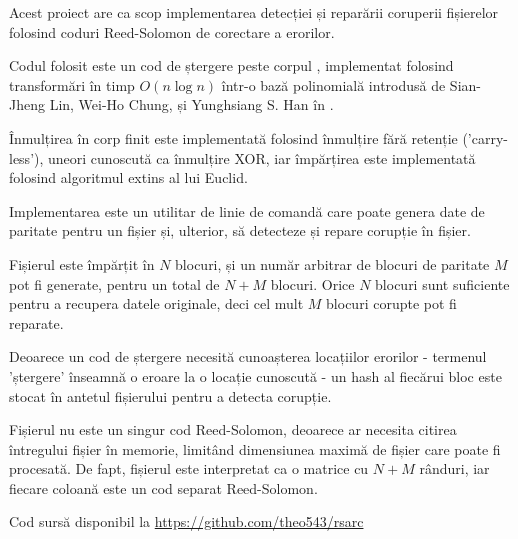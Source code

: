 \begin{abstractpage}

\begin{rezumat}

\indent

Acest proiect are ca scop implementarea detecției și reparării coruperii fișierelor folosind coduri Reed-Solomon de corectare a erorilor.

Codul folosit este un cod de ștergere peste corpul , implementat folosind transformări în timp $O(n \log n)$ într-o bază polinomială introdusă de Sian-Jheng Lin, Wei-Ho Chung, și Yunghsiang S. Han în \cite{novel-poly}.

Înmulțirea în corp finit este implementată folosind înmulțire fără retenție ('carry-less'), uneori cunoscută ca înmulțire XOR, iar împărțirea este implementată folosind algoritmul extins al lui Euclid.

Implementarea este un utilitar de linie de comandă care poate genera date de paritate pentru un fișier și, ulterior, să detecteze și repare corupție în fișier.

Fișierul este împărțit în $N$ blocuri, și un număr arbitrar de blocuri de paritate $M$ pot fi generate, pentru un total de $N + M$ blocuri.
Orice $N$ blocuri sunt suficiente pentru a recupera datele originale, deci cel mult $M$ blocuri corupte pot fi reparate.

Deoarece un cod de ștergere necesită cunoașterea locațiilor erorilor - termenul 'ștergere' înseamnă o eroare la o locație cunoscută - un hash al fiecărui bloc este stocat în antetul fișierului pentru a detecta corupție.

Fișierul nu este un singur cod Reed-Solomon, deoarece ar necesita citirea întregului fișier în memorie, limitând dimensiunea maximă de fișier care poate fi procesată.
De fapt, fișierul este interpretat ca o matrice cu $N + M$ rânduri, iar fiecare coloană este un cod separat Reed-Solomon.

\vspace*{\fill}
\begin{center}Cod sursă disponibil la \url{https://github.com/theo543/rsarc}\end{center}

\end{rezumat}

\end{abstractpage}
